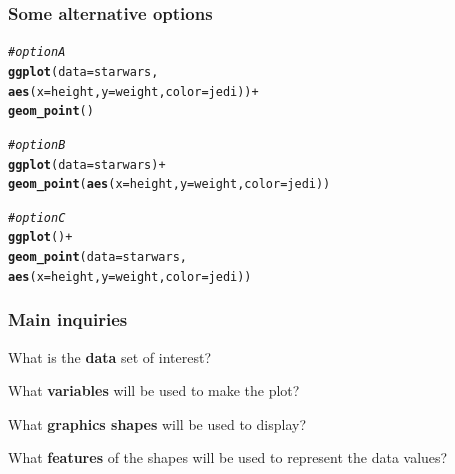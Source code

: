 \documentclass[12pt]{beamer}\usepackage[]{graphicx}\usepackage[]{color}
\makeatletter
\newcommand{\hlcom}[1]{\textcolor[rgb]{0.678,0.584,0.686}{\textit{#1}}}%
\newcommand{\hlopt}[1]{\textcolor[rgb]{0,0,0}{#1}}%
\newcommand{\hlstd}[1]{\textcolor[rgb]{0.345,0.345,0.345}{#1}}%
\newcommand{\hlkwc}[1]{\textcolor[rgb]{0.333,0.667,0.333}{#1}}%
\newcommand{\hlkwd}[1]{\textcolor[rgb]{0.737,0.353,0.396}{\textbf{#1}}}%
\newenvironment{kframe}{%
 \def\at@end@of@kframe{}%
 \ifinner\ifhmode%
  \def\at@end@of@kframe{\end{minipage}}%
  \begin{minipage}{\columnwidth}%
 \fi\fi%
 \def\FrameCommand##1{\hskip\@totalleftmargin \hskip-\fboxsep
 \colorbox{shadecolor}{##1}\hskip-\fboxsep
     \hskip-\linewidth \hskip-\@totalleftmargin \hskip\columnwidth}%
 \MakeFramed {\advance\hsize-\width
   \@totalleftmargin\z@ \linewidth\hsize
   \@setminipage}}%
 {\par\unskip\endMakeFramed%
 \at@end@of@kframe}
\newenvironment{knitrout}{}{} %
\makeatother
\begin{document}
\begin{frame}[fragile]
\frametitle{Some alternative options}
\begin{knitrout}\footnotesize
{}\color{fgcolor}\begin{kframe}
\begin{alltt}
\hlcom{# option A}
\hlkwd{ggplot}\hlstd{(}\hlkwc{data} \hlstd{= starwars,}
       \hlkwd{aes}\hlstd{(}\hlkwc{x} \hlstd{= height,} \hlkwc{y} \hlstd{= weight,} \hlkwc{color} \hlstd{= jedi))} \hlopt{+}
  \hlkwd{geom_point}\hlstd{()}
\end{alltt}
\end{kframe}
\end{knitrout}

\pause
\begin{knitrout}\footnotesize
{}\color{fgcolor}\begin{kframe}
\begin{alltt}
\hlcom{# option B}
\hlkwd{ggplot}\hlstd{(}\hlkwc{data} \hlstd{= starwars)} \hlopt{+}
  \hlkwd{geom_point}\hlstd{(}\hlkwd{aes}\hlstd{(}\hlkwc{x} \hlstd{= height,} \hlkwc{y} \hlstd{= weight,} \hlkwc{color} \hlstd{= jedi))}
\end{alltt}
\end{kframe}
\end{knitrout}

\pause
\begin{knitrout}\footnotesize
{}\color{fgcolor}\begin{kframe}
\begin{alltt}
\hlcom{# option C}
\hlkwd{ggplot}\hlstd{()} \hlopt{+}
  \hlkwd{geom_point}\hlstd{(}\hlkwc{data} \hlstd{= starwars,}
             \hlkwd{aes}\hlstd{(}\hlkwc{x} \hlstd{= height,} \hlkwc{y} \hlstd{= weight,} \hlkwc{color} \hlstd{= jedi))}
\end{alltt}
\end{kframe}
\end{knitrout}
\end{frame}


\begin{frame}
\frametitle{Main inquiries}

\bbi
  \item What is the \textbf{data} set of interest?
  \item What \textbf{variables} will be used to make the plot?
  \item What \textbf{graphics shapes} will be used to display?
  \item What \textbf{features} of the shapes will be used to represent the data values?
\ei
\eb

\end{frame}
\end{document}
